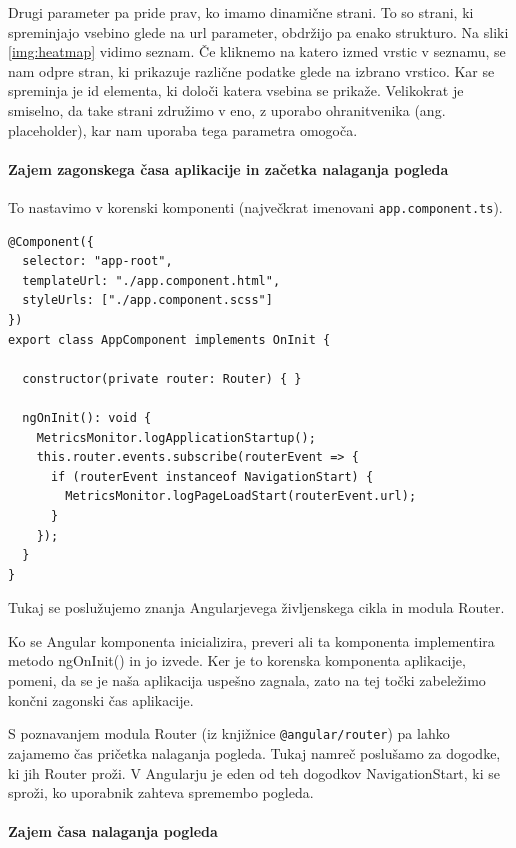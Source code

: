 \documentclass[a4paper, 12pt]{book}
\begin{document}
Drugi parameter pa pride prav, ko imamo dinamične strani. To so strani, ki spreminjajo vsebino glede na url parameter, obdržijo pa enako strukturo. Na sliki \ref{img:heatmap} vidimo seznam. Če kliknemo na katero izmed vrstic v seznamu, se nam odpre stran, ki prikazuje različne podatke glede na izbrano vrstico. Kar se spreminja je id elementa, ki določi katera vsebina se prikaže. Velikokrat je smiselno, da take strani združimo v eno, z uporabo ohranitvenika (ang. placeholder), kar nam uporaba tega parametra omogoča.

\paragraph{Zajem zagonskega časa aplikacije in začetka nalaganja pogleda}

To nastavimo v korenski komponenti (največkrat imenovani \verb|app.component.ts|).

\begin{lstlisting}[label=lib_app_comp, caption=Zajem zagonskega časa aplikacije in začetka nalaganja pogleda]
@Component({
  selector: "app-root",
  templateUrl: "./app.component.html",
  styleUrls: ["./app.component.scss"]
})
export class AppComponent implements OnInit {

  constructor(private router: Router) { }

  ngOnInit(): void {
    MetricsMonitor.logApplicationStartup();
    this.router.events.subscribe(routerEvent => {
      if (routerEvent instanceof NavigationStart) {
        MetricsMonitor.logPageLoadStart(routerEvent.url);
      }
    });
  }
}
\end{lstlisting}

Tukaj se poslužujemo znanja Angularjevega življenskega cikla in modula Router.

Ko se Angular komponenta inicializira, preveri ali ta komponenta implementira metodo ngOnInit() in jo izvede. Ker je to korenska komponenta aplikacije, pomeni, da se je naša aplikacija uspešno zagnala, zato na tej točki zabeležimo končni zagonski čas aplikacije.

S poznavanjem modula Router (iz knjižnice \verb|@angular/router|) pa lahko zajamemo čas pričetka nalaganja pogleda. Tukaj namreč poslušamo za dogodke, ki jih Router proži. V Angularju je eden od teh dogodkov NavigationStart, ki se sproži, ko uporabnik zahteva spremembo pogleda.

\paragraph{Zajem časa nalaganja pogleda}
\end{document}
